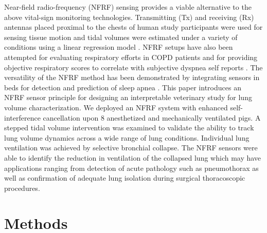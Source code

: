 \documentclass[journal]{IEEEtran}
\begin{document}
Near-field radio-frequency (NFRF) sensing provides a viable alternative to the above vital-sign monitoring technologies. Transmitting (Tx) and receiving (Rx) antennas placed proximal to the chests of human study participants were used for sensing tissue motion and tidal volumes were estimated under a variety of conditions using a linear regression model \cite{sharmaWearableRFSensor2019}\cite{sharmaWearableRadiofrequencySensing2020}. NFRF setups have also been attempted for evaluating respiratory efforts in COPD patients and for providing objective respiratory scores to correlate with subjective dyspnea self reports \cite{zhangFeasibilityStudyUsing2024}\cite{zhangObjectiveScoringPhysiologically2022}. The versatility of the NFRF method has been demonstrated by integrating sensors in beds for detection and prediction of sleep apnea \cite{zhangFurnitureIntegratedRespirationSensors2021}.  This paper introduces an NFRF sensor principle for designing an interpretable veterinary study for lung volume characterization. We deployed an NFRF system with enhanced self-interference cancellation upon 8 anesthetized and mechanically ventilated pigs. A stepped tidal volume intervention was examined to validate the ability to track lung volume dynamics across a wide range of lung conditions. Individual lung ventilation was achieved by selective bronchial collapse. The NFRF sensors were able to identify the reduction in ventilation of the collapsed lung which may have applications ranging from detection of acute pathology such as pneumothorax as well as confirmation of adequate lung isolation during surgical thoracoscopic procedures.
\section{Methods}
\end{document}
